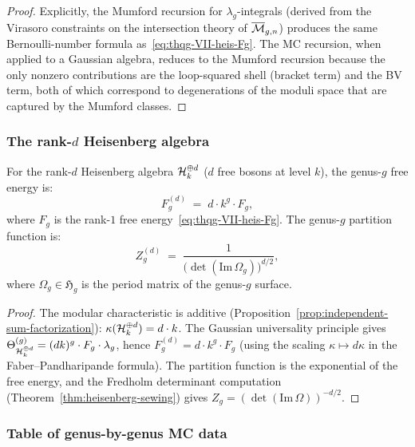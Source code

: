 \begin{proof}
Explicitly, the Mumford recursion for $\lambda_g$-integrals
(derived from the Virasoro constraints on the intersection
theory of $\overline{\mathcal{M}}_{g,n}$) produces the same
Bernoulli-number formula as~\eqref{eq:thqg-VII-heis-Fg}.
The MC recursion, when applied to a Gaussian algebra, reduces to
the Mumford recursion because the only nonzero contributions are
the loop-squared shell (bracket term) and the BV term, both of
which correspond to degenerations of the moduli space that are
captured by the Mumford classes.
\end{proof}

\subsubsection{The rank-$d$ Heisenberg algebra}
\label{subsubsec:thqg-VII-heis-rank-d}

\begin{corollary}
\label{cor:thqg-VII-rank-d}
For the rank-$d$ Heisenberg algebra $\mathcal{H}_k^{\oplus d}$
\textup{(}$d$ free bosons at level $k$\textup{)}, the genus-$g$
free energy is:
\begin{equation}\label{eq:thqg-VII-rank-d-Fg}
F_g^{(d)}
\;=\;
d \cdot k^g \cdot F_g,
\end{equation}
where $F_g$ is the rank-$1$ free energy~\eqref{eq:thqg-VII-heis-Fg}.
The genus-$g$ partition function is:
\begin{equation}\label{eq:thqg-VII-rank-d-Zg}
Z_g^{(d)}
\;=\;
\frac{1}{\bigl(\det(\mathrm{Im}\,\Omega_g)\bigr)^{d/2}},
\end{equation}
where $\Omega_g \in \mathfrak{H}_g$ is the period matrix of
the genus-$g$ surface.
\end{corollary}

\begin{proof}
The modular characteristic is additive
(Proposition~\ref{prop:independent-sum-factorization}):
$\kappa(\mathcal{H}_k^{\oplus d}) = d \cdot k$. The Gaussian
universality principle gives $\Theta^{(g)}_{\mathcal{H}_k^{\oplus d}}
= (dk)^g \cdot F_g \cdot \lambda_g$, hence
$F_g^{(d)} = d \cdot k^g \cdot F_g$ (using the scaling
$\kappa \mapsto d\kappa$ in the Faber--Pandharipande formula).
The partition function is the exponential of the free energy,
and the Fredholm determinant computation
(Theorem~\ref{thm:heisenberg-sewing})
gives $Z_g = (\det(\mathrm{Im}\,\Omega))^{-d/2}$.
\end{proof}

\subsubsection{Table of genus-by-genus MC data}
\label{subsubsec:thqg-VII-table}

